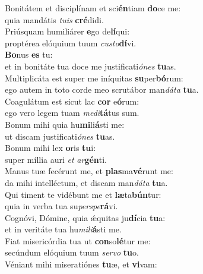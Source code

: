 \evenverse Bonitátem et disciplínam et sci\textbf{én}tiam \textbf{do}ce me:~\*\\
\evenverse quia mandátis \textit{tu}\textit{is} \textbf{cré}didi.\\
\oddverse Priúsquam humiliárer \textbf{e}go de\textbf{lí}qui:~\*\\
\oddverse proptérea elóquium tuum \textit{cu}\textit{sto}\textbf{dí}vi.\\
\evenverse \textbf{Bo}nus \textbf{es} tu:~\*\\
\evenverse et in bonitáte tua doce me justificati\textit{ó}\textit{nes} \textbf{tu}as.\\
\oddverse Multiplicáta est super me iníquitas \textbf{su}per\textbf{bó}rum:~\*\\
\oddverse ego autem in toto corde meo scrutábor man\textit{dá}\textit{ta} \textbf{tu}a.\\
\evenverse Coagulátum est sicut lac \textbf{cor} e\textbf{ó}rum:~\*\\
\evenverse ego vero legem tuam \textit{me}\textit{di}\textbf{tá}tus sum.\\
\oddverse Bonum mihi quia hu\textbf{mi}li\textbf{á}sti me:~\*\\
\oddverse ut discam justificati\textit{ó}\textit{nes} \textbf{tu}as.\\
\evenverse Bonum mihi lex \textbf{o}ris \textbf{tu}i:~\*\\
\evenverse super míllia auri \textit{et} \textit{ar}\textbf{gén}ti.\\
\oddverse Manus tuæ fecérunt me, et \textbf{plas}ma\textbf{vé}runt me:~\*\\
\oddverse da mihi intelléctum, et discam man\textit{dá}\textit{ta} \textbf{tu}a.\\
\evenverse Qui timent te vidébunt me et \textbf{læ}ta\textbf{bún}tur:~\*\\
\evenverse quia in verba tua su\textit{per}\textit{spe}\textbf{rá}vi.\\
\oddverse Cognóvi, Dómine, quia ǽquitas ju\textbf{dí}cia \textbf{tu}a:~\*\\
\oddverse et in veritáte tua hu\textit{mi}\textit{li}\textbf{á}sti me.\\
\evenverse Fiat misericórdia tua ut \textbf{con}so\textbf{lé}tur me:~\*\\
\evenverse secúndum elóquium tuum \textit{ser}\textit{vo} \textbf{tu}o.\\
\oddverse Véniant mihi miseratiónes \textbf{tu}æ, et \textbf{vi}vam:~\*\\
